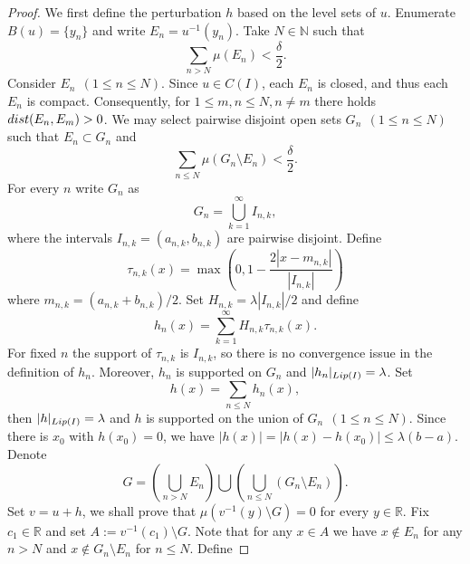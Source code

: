 \documentclass[10pt,a4paper]{amsart}
\numberwithin{equation}{section}
\begin{document}
\begin{proof}
    We first define the perturbation $h$ based on the level sets of $u$. Enumerate $B(u)=\{y_n\}$ and write $E_n=u^{-1}(y_n)$. Take $N\in\mathbb{N}$ such that
    \begin{equation}
        \nonumber
        \sum_{n>N}\mu(E_n)<\frac{\delta}{2}.
    \end{equation}
    Consider $E_n~~(1\le n\le N)$.
    Since $u\in C(I)$, each $E_n$ is closed, and thus each $E_n$ is compact. Consequently, for $1\le m,n\le N, n\neq m$ there holds ${\rm dist}(E_n,E_m)>0$. We may select pairwise disjoint open sets $G_n~~(1\le n\le N)$ such that $E_n\subset G_n$ and 
    \begin{equation}
        \nonumber
        \sum_{n\le N}\mu(G_n\setminus E_n)<\frac{\delta}{2}.
    \end{equation}
    For every $n$ write $G_n$ as
    \begin{equation}
        \nonumber
        G_n=\bigcup_{k=1}^\infty I_{n,k},
    \end{equation}
    where the intervals $I_{n,k}=(a_{n,k},b_{n,k})$ are pairwise disjoint. Define 
    $$
    \tau_{n,k}(x)=\max\left(0,1-\frac{2|x-m_{n,k}|}{|I_{n,k}|}\right)
    $$
    where $m_{n,k}=(a_{n,k}+b_{n,k})/2$. Set $H_{n,k}=\lambda|I_{n,k}|/2$ and define
    \begin{equation}
        \nonumber
        h_n(x)=\sum_{k=1}^\infty H_{n,k}\tau_{n,k}(x).
    \end{equation}
    For fixed $n$ the support of $\tau_{n,k}$ is $I_{n,k}$, so there is no convergence issue in the definition of $h_n$. Moreover, $h_n$ is supported on $G_n$ and $|h_n|_{{\rm Lip}(I)}=\lambda$.
    Set
    \begin{equation}
        \nonumber
        h(x)=\sum_{n\le N}h_n(x),
    \end{equation}
    then $|h|_{{\rm Lip}(I)}=\lambda$ and $h$ is supported on the union of $G_n~~(1\le n\le N)$. Since there is $x_0$ with $h(x_0)=0$, we have $|h(x)|=|h(x)-h(x_0)|\le\lambda(b-a)$. Denote
    \begin{equation}
        \nonumber
        G=\left(\bigcup_{n>N}E_n\right)\bigcup\left(\bigcup_{n\le N}(G_n\setminus E_n)\right).
    \end{equation}
    Set $v=u+h$, we shall prove that $\mu(v^{-1}(y)\setminus G)=0$ for every $y\in\mathbb{R}$. Fix $c_1\in\mathbb{R}$ and set $A:=v^{-1}(c_1)\setminus G$.
    Note that for any $x\in A$ we have $x\notin E_n$ for any $n>N$ and $x\notin G_n\setminus E_n$ for $n\le N$. Define

\end{proof}
\end{document}

